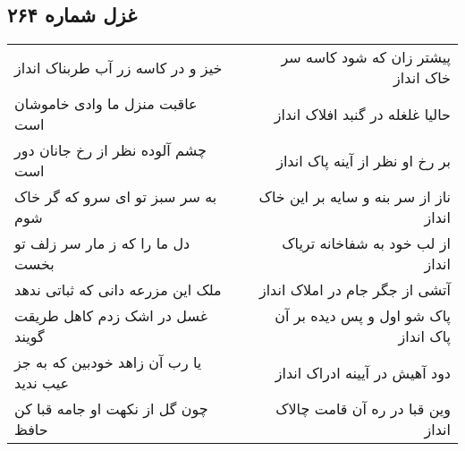 \begin{center}
\section*{غزل شماره ۲۶۴}
\label{sec:sh264}
\begin{longtable}{l p{0.5cm} r}
خیز و در کاسه زر آب طربناک انداز
&&
پیشتر زان که شود کاسه سر خاک انداز
\\
عاقبت منزل ما وادی خاموشان است
&&
حالیا غلغله در گنبد افلاک انداز
\\
چشم آلوده نظر از رخ جانان دور است
&&
بر رخ او نظر از آینه پاک انداز
\\
به سر سبز تو ای سرو که گر خاک شوم
&&
ناز از سر بنه و سایه بر این خاک انداز
\\
دل ما را که ز مار سر زلف تو بخست
&&
از لب خود به شفاخانه تریاک انداز
\\
ملک این مزرعه دانی که ثباتی ندهد
&&
آتشی از جگر جام در املاک انداز
\\
غسل در اشک زدم کاهل طریقت گویند
&&
پاک شو اول و پس دیده بر آن پاک انداز
\\
یا رب آن زاهد خودبین که به جز عیب ندید
&&
دود آهیش در آیینه ادراک انداز
\\
چون گل از نکهت او جامه قبا کن حافظ
&&
وین قبا در ره آن قامت چالاک انداز
\\
\end{longtable}
\end{center}
